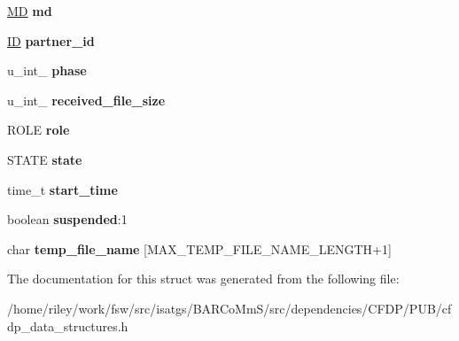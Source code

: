\begin{DoxyCompactItemize}
\item 
\hyperlink{struct_m_d}{MD} {\bfseries md}\hypertarget{struct_t_r_a_n_s___s_t_a_t_u_s_a827d89e86e8e197147720246e9a22708}{}\label{struct_t_r_a_n_s___s_t_a_t_u_s_a827d89e86e8e197147720246e9a22708}

\item 
\hyperlink{struct_i_d}{ID} {\bfseries partner\+\_\+id}\hypertarget{struct_t_r_a_n_s___s_t_a_t_u_s_ab91575938015138bfe798e5ff514e793}{}\label{struct_t_r_a_n_s___s_t_a_t_u_s_ab91575938015138bfe798e5ff514e793}

\item 
u\+\_\+int\+\_ {\bfseries phase}\hypertarget{struct_t_r_a_n_s___s_t_a_t_u_s_a84b743695ba1ede8736c3f5ebb05cd99}{}\label{struct_t_r_a_n_s___s_t_a_t_u_s_a84b743695ba1ede8736c3f5ebb05cd99}

\item 
u\+\_\+int\+\_ {\bfseries received\+\_\+file\+\_\+size}\hypertarget{struct_t_r_a_n_s___s_t_a_t_u_s_abc401184f057ba16d024b046deaf3322}{}\label{struct_t_r_a_n_s___s_t_a_t_u_s_abc401184f057ba16d024b046deaf3322}

\item 
R\+O\+LE {\bfseries role}\hypertarget{struct_t_r_a_n_s___s_t_a_t_u_s_a8cc91d6686b3e7ee150d6ed731a7927d}{}\label{struct_t_r_a_n_s___s_t_a_t_u_s_a8cc91d6686b3e7ee150d6ed731a7927d}

\item 
S\+T\+A\+TE {\bfseries state}\hypertarget{struct_t_r_a_n_s___s_t_a_t_u_s_a436e8d0cdf3b6f4a6fee533a6aef6bf8}{}\label{struct_t_r_a_n_s___s_t_a_t_u_s_a436e8d0cdf3b6f4a6fee533a6aef6bf8}

\item 
time\+\_\+t {\bfseries start\+\_\+time}\hypertarget{struct_t_r_a_n_s___s_t_a_t_u_s_aaf374215936de0d07f1805747e27ddae}{}\label{struct_t_r_a_n_s___s_t_a_t_u_s_aaf374215936de0d07f1805747e27ddae}

\item 
boolean {\bfseries suspended}\+:1\hypertarget{struct_t_r_a_n_s___s_t_a_t_u_s_ab0cdb83414e6745e817827bdf42be838}{}\label{struct_t_r_a_n_s___s_t_a_t_u_s_ab0cdb83414e6745e817827bdf42be838}

\item 
char {\bfseries temp\+\_\+file\+\_\+name} \mbox{[}M\+A\+X\+\_\+\+T\+E\+M\+P\+\_\+\+F\+I\+L\+E\+\_\+\+N\+A\+M\+E\+\_\+\+L\+E\+N\+G\+TH+1\mbox{]}\hypertarget{struct_t_r_a_n_s___s_t_a_t_u_s_a2993ede69caa9696aa5777840c19e5e5}{}\label{struct_t_r_a_n_s___s_t_a_t_u_s_a2993ede69caa9696aa5777840c19e5e5}

\end{DoxyCompactItemize}


The documentation for this struct was generated from the following file\+:\begin{DoxyCompactItemize}
\item 
/home/riley/work/fsw/src/isatgs/\+B\+A\+R\+Co\+Mm\+S/src/dependencies/\+C\+F\+D\+P/\+P\+U\+B/cfdp\+\_\+data\+\_\+structures.\+h\end{DoxyCompactItemize}
